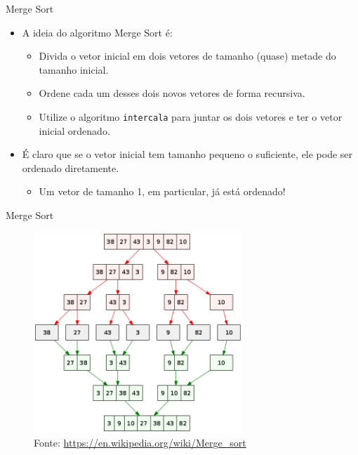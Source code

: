 \documentclass[handout]{beamer}
\newcommand{\cod}[1]{\texttt{#1}}
\begin{document}
\begin{frame}[fragile]{Merge Sort}

    \begin{itemize}
        \item A ideia do algoritmo Merge Sort é:
        \begin{itemize}
            \item Divida o vetor inicial em dois vetores de tamanho (quase) metade do tamanho inicial.
            \item Ordene cada um desses dois novos vetores de forma recursiva.
            \item Utilize o algoritmo \cod{intercala} para juntar os dois vetores e ter o vetor inicial ordenado.
        \end{itemize}
        \item É claro que se o vetor inicial tem tamanho pequeno o suficiente, ele pode ser ordenado diretamente.
        \begin{itemize}
            \item Um vetor de tamanho 1, em particular, já está ordenado!
        \end{itemize}
    \end{itemize}

\end{frame}

\begin{frame}{Merge Sort}

    \begin{figure}
        \centering
        \includegraphics[width=0.7\textwidth]{mergesort.png}
        \caption{Fonte: \url{https://en.wikipedia.org/wiki/Merge_sort}}
    \end{figure}
    
\end{frame}
\end{document}

